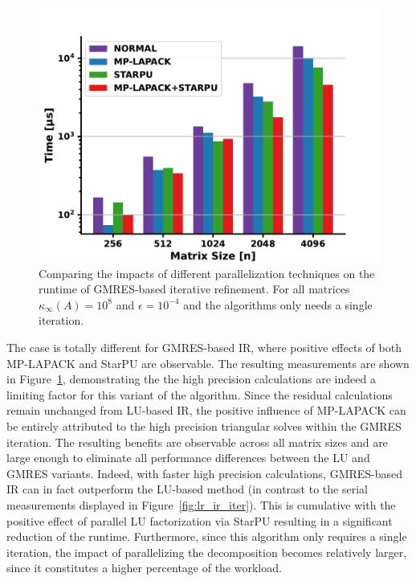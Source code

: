 \begin{figure}[ht]
    \centering
    \includegraphics[width=0.8\linewidth]{chapters/5_experiments/figures/GMRES_parallel.pdf}
    \caption[Parallel GMRES-based IR]{Comparing the impacts of different parallelization techniques on the runtime of GMRES-based iterative refinement. For all matrices $\kappa_\infty(A)=10^8$ and $\epsilon=10^{-4}$ and the algorithms only needs a single iteration.}
    \label{fig:gmres_parallel}
\end{figure}

The case is totally different for GMRES-based IR, where positive effects of both MP-LAPACK and StarPU are observable. The resulting measurements are shown in Figure~\hyperref[fig:gmres_parallel]{\ref{fig:gmres_parallel}}, demonstrating the the high precision calculations are indeed a limiting factor for this variant of the algorithm. Since the residual calculations remain unchanged from LU-based IR, the positive influence of MP-LAPACK can be entirely attributed to the high precision triangular solves within the GMRES iteration. The resulting benefits are observable across all matrix sizes and are large enough to eliminate all performance differences between the LU and GMRES variants. Indeed, with faster high precision calculations, GMRES-based IR can in fact outperform the LU-based method (in contrast to the serial measurements displayed in Figure~\hyperref[fig:lr_ir_iter]{\ref{fig:lr_ir_iter}}). 
This is cumulative with the positive effect of parallel LU factorization via StarPU resulting in a significant reduction of the runtime. Furthermore, since this algorithm only requires a single iteration, the impact of parallelizing the decomposition becomes relatively larger, since it constitutes a higher percentage of the workload.

